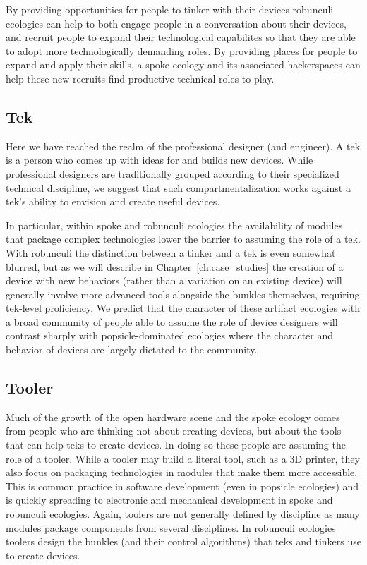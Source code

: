 By providing opportunities for people to tinker with their devices robunculi ecologies can help to both engage people in a conversation about their devices, and recruit people to expand their technological capabilites so that they are able to adopt more technologically demanding roles. By providing places for people to expand and apply their skills, a spoke ecology and its associated hackerspaces can help these new recruits find productive technical roles to play.

\subsection{Tek}
Here we have reached the realm of the professional designer (and engineer). A tek is a person who comes up with ideas for and builds new devices. 
While professional designers are traditionally grouped according to their specialized technical discipline, we suggest that such compartmentalization works against a tek's ability to envision and create useful devices. 

In particular, within spoke and robunculi ecologies the availability of modules that package complex technologies lower the barrier to assuming the role of a tek. 
With robunculi the distinction between a tinker and a tek is even somewhat blurred, but as we will describe in Chapter~\ref{ch:case_studies} the creation of a device with new behaviors (rather than a variation on an existing device) will generally involve more advanced tools alongside the bunkles themselves, requiring tek{}-level proficiency.
We predict that the character of these artifact ecologies with a broad community of people able to assume the role of device designers will contrast sharply with popsicle{}-dominated ecologies where the character and behavior of devices are largely dictated to the community.

\subsection{Tooler}
Much of the growth of the open hardware scene and the spoke ecology comes from people who are thinking not about creating devices, but about the tools that can help teks to create devices. In doing so these people are assuming the role of a tooler. While a tooler may build a literal tool, such as a 3D printer, they also focus on packaging technologies in modules that make them more accessible. This is common practice in software development (even in popsicle ecologies) and is quickly spreading to electronic and mechanical development in spoke and robunculi ecologies. Again, toolers are not generally defined by discipline as many modules package components from several disciplines. In robunculi ecologies toolers design the bunkles (and their control algorithms) that teks and tinkers use to create devices.


